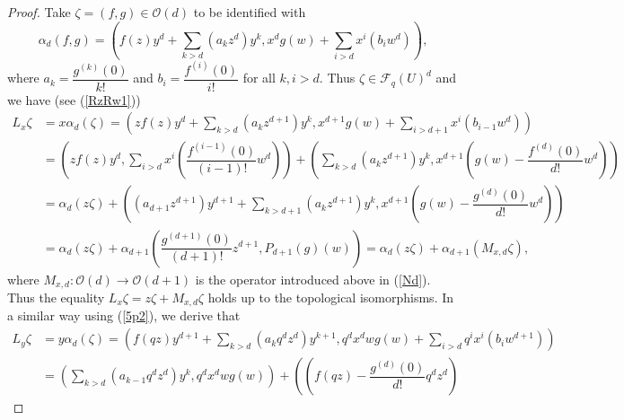 \documentclass[12pt,reqno]{amsart}%
\theoremstyle{plain}
\numberwithin{theorem}{section} \numberwithin{equation}{section}
\numberwithin{lemma}{section}
\numberwithin{remark}{section}
\numberwithin{example}{section}
\numberwithin{proposition}{section}
\numberwithin{definition}{section}
\numberwithin{corollary}{section}
\begin{document}
\begin{proof}
Take $\zeta=\left(  f,g\right)  \in\mathcal{O}\left(  d\right)  $ to be
identified with
\[
\alpha_{d}\left(  f,g\right)  =\left(  f\left(  z\right)  y^{d}+\sum
_{k>d}\left(  a_{k}z^{d}\right)  y^{k},x^{d}g\left(  w\right)  +\sum
_{i>d}x^{i}\left(  b_{i}w^{d}\right)  \right)  ,
\]
where $a_{k}=\dfrac{g^{\left(  k\right)  }\left(  0\right)  }{k!}$ and
$b_{i}=\dfrac{f^{\left(  i\right)  }\left(  0\right)  }{i!}$ for all $k,i>d$.
Thus $\zeta\in\mathcal{F}_{q}\left(  U\right)  ^{d}$ and we have (see
(\ref{RzRw1}))
\begin{align*}
L_{x}\zeta &  =x\alpha_{d}\left(  \zeta\right)  =\left(  zf\left(  z\right)
y^{d}+\sum_{k>d}\left(  a_{k}z^{d+1}\right)  y^{k},x^{d+1}g\left(  w\right)
+\sum_{i>d+1}x^{i}\left(  b_{i-1}w^{d}\right)  \right) \\
&  =\left(  zf\left(  z\right)  y^{d},\sum_{i>d}x^{i}\left(  \dfrac{f^{\left(
i-1\right)  }\left(  0\right)  }{\left(  i-1\right)  !}w^{d}\right)  \right)
+\left(  \sum_{k>d}\left(  a_{k}z^{d+1}\right)  y^{k},x^{d+1}\left(  g\left(
w\right)  -\dfrac{f^{\left(  d\right)  }\left(  0\right)  }{d!}w^{d}\right)
\right) \\
&  =\alpha_{d}\left(  z\zeta\right)  +\left(  \left(  a_{d+1}z^{d+1}\right)
y^{d+1}+\sum_{k>d+1}\left(  a_{k}z^{d+1}\right)  y^{k},x^{d+1}\left(  g\left(
w\right)  -\dfrac{g^{\left(  d\right)  }\left(  0\right)  }{d!}w^{d}\right)
\right) \\
&  =\alpha_{d}\left(  z\zeta\right)  +\alpha_{d+1}\left(  \dfrac{g^{\left(
d+1\right)  }\left(  0\right)  }{\left(  d+1\right)  !}z^{d+1},P_{d+1}\left(
g\right)  \left(  w\right)  \right)  =\alpha_{d}\left(  z\zeta\right)
+\alpha_{d+1}\left(  M_{x,d}\zeta\right)  ,
\end{align*}
where $M_{x,d}:\mathcal{O}\left(  d\right)  \rightarrow\mathcal{O}\left(
d+1\right)  $ is the operator introduced above in (\ref{Nd}). Thus the
equality $L_{x}\zeta=z\zeta+M_{x,d}\zeta$ holds up to the topological
isomorphisms. In a similar way using (\ref{5p2}), we derive that
\begin{align*}
L_{y}\zeta &  =y\alpha_{d}\left(  \zeta\right)  =\left(  f\left(  qz\right)
y^{d+1}+\sum_{k>d}\left(  a_{k}q^{d}z^{d}\right)  y^{k+1},q^{d}x^{d}wg\left(
w\right)  +\sum_{i>d}q^{i}x^{i}\left(  b_{i}w^{d+1}\right)  \right) \\
&  =\left(  \sum_{k>d}\left(  a_{k-1}q^{d}z^{d}\right)  y^{k},q^{d}%
x^{d}wg\left(  w\right)  \right)  +\left(  \left(  f\left(  qz\right)
-\dfrac{g^{\left(  d\right)  }\left(  0\right)  }{d!}q^{d}z^{d}\right)

\end{align*}
\end{proof}
\end{document}
